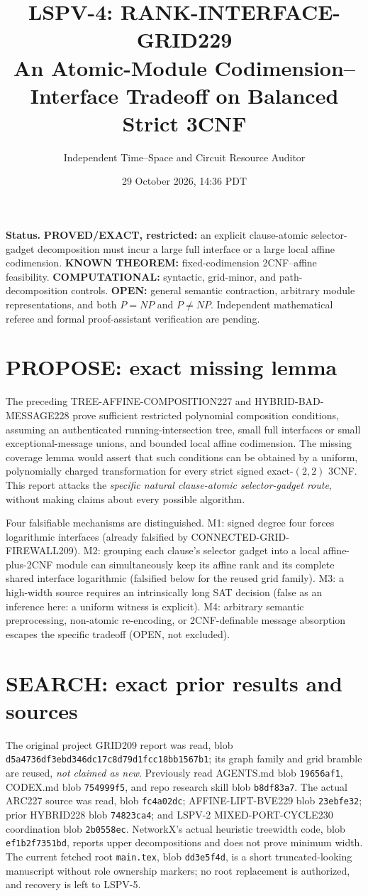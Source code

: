 \documentclass[11pt]{article}
\title{LSPV-4: RANK-INTERFACE-GRID229\\An Atomic-Module Codimension--Interface Tradeoff on Balanced Strict 3CNF}
\author{Independent Time--Space and Circuit Resource Auditor}
\date{29 October 2026, 14:36 PDT}
\begin{document}
\maketitle
\noindent\textbf{Status.} \textbf{PROVED/EXACT, restricted:} an explicit clause-atomic selector-gadget decomposition must incur a large full interface or a large local affine codimension. \textbf{KNOWN THEOREM:} fixed-codimension 2CNF--affine feasibility. \textbf{COMPUTATIONAL:} syntactic, grid-minor, and path-decomposition controls. \textbf{OPEN:} general semantic contraction, arbitrary module representations, and both $P=NP$ and $P\ne NP$. Independent mathematical referee and formal proof-assistant verification are pending.

\section{PROPOSE: exact missing lemma}
The preceding TREE-AFFINE-COMPOSITION227 and HYBRID-BAD-MESSAGE228 prove sufficient restricted polynomial composition conditions, assuming an authenticated running-intersection tree, small full interfaces or small exceptional-message unions, and bounded local affine codimension. The missing coverage lemma would assert that such conditions can be obtained by a uniform, polynomially charged transformation for every strict signed exact-$(2,2)$ 3CNF. This report attacks the \emph{specific natural clause-atomic selector-gadget route}, without making claims about every possible algorithm.

Four falsifiable mechanisms are distinguished. M1: signed degree four forces logarithmic interfaces (already falsified by CONNECTED-GRID-FIREWALL209). M2: grouping each clause's selector gadget into a local affine-plus-2CNF module can simultaneously keep its affine rank and its complete shared interface logarithmic (falsified below for the reused grid family). M3: a high-width source requires an intrinsically long SAT decision (false as an inference here: a uniform witness is explicit). M4: arbitrary semantic preprocessing, non-atomic re-encoding, or 2CNF-definable message absorption escapes the specific tradeoff (OPEN, not excluded).

\section{SEARCH: exact prior results and sources}
The original project GRID209 report was read, blob \texttt{d5a4736df3ebd346dc17c8d79d1fcc18bb1567b1}; its graph family and grid bramble are reused, \emph{not claimed as new}. Previously read AGENTS.md blob \texttt{19656af1}, CODEX.md blob \texttt{754999f5}, and repo research skill blob \texttt{b8df83a7}. The actual ARC227 source was read, blob \texttt{fc4a02dc}; AFFINE-LIFT-BVE229 blob \texttt{23ebfe32}; prior HYBRID228 blob \texttt{74823ca4}; and LSPV-2 MIXED-PORT-CYCLE230 coordination blob \texttt{2b0558ec}. NetworkX's actual heuristic treewidth code, blob \texttt{ef1b2f7351bd}, reports upper decompositions and does not prove minimum width. The current fetched root \texttt{main.tex}, blob \texttt{dd3e5f4d}, is a short truncated-looking manuscript without role ownership markers; no root replacement is authorized, and recovery is left to LSPV-5.
\end{document}
